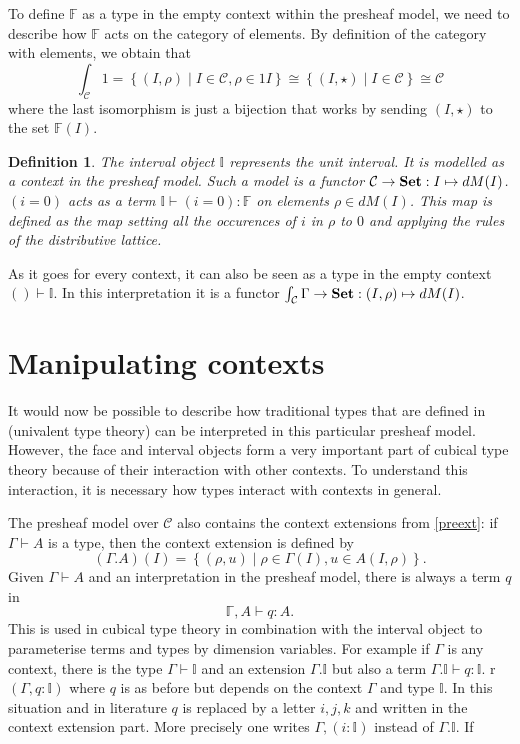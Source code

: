 \documentclass[12pt,a4paper,twoside,xetex]{book}
\newcommand{\keyword}[1]{\emph{#1}\index{#1}}
\newtheorem{definition}[theorem]{Definition}
\begin{document}
To define $\mathbb{F}$ as a type in the empty context within the presheaf model, we need to describe how $\mathbb{F}$ acts on the category of elements. By definition of the category with elements, we obtain that $$\int_{\mathcal{C}} 1 = \left\{ (I, \rho ) \mid I \in \mathcal{C}, \rho \in 1I \right\} \cong \left\{ (I, \star ) \mid I \in \mathcal{C} \right\}  \cong \mathcal{C}$$ where the last isomorphism is just a bijection that works by sending $(I, \star )$ to the set $\mathbb{F}(I)$.


\begin{definition}\label{interval}
The \keyword{interval object} $\mathbb{I}$ represents the unit interval. It is modelled as a context in the presheaf model. Such a model is a functor $\mathcal{C} \rightarrow \text{\textbf{Set}} : I \mapsto dM(I)$.  $(i=0)$ acts as a term $\mathbb{I} \vdash (i = 0) : \mathbb{F}$ on elements $\rho \in dM (I)$. This map is defined as the map setting all the occurences of $i$ in $\rho$ to $0$ and applying the rules of the distributive lattice.
\end{definition}

As it goes for every context, it can also be seen as a type in the empty context $() \vdash \mathbb{I}$. 
In this interpretation it is a functor  $\int_{\mathcal{C}} \Gamma \rightarrow \text{\textbf{Set}} : (I,\rho) \mapsto dM(I)$.



\section{Manipulating contexts}

It would now be possible to describe how traditional types that are defined in (univalent type theory) can be interpreted in this particular presheaf model. However, the face and interval objects form a very important part of cubical type theory because of their interaction with other contexts. To understand this interaction, it is necessary how types interact with contexts in general.  

The presheaf model over $\mathcal{C}$ also contains the context extensions from \cref{preext}: if $\Gamma \vdash A$ is a type, then the context extension is defined by $$(\Gamma . A)(I) = \left\{ (\rho , u ) \mid \rho \in \Gamma (I), u \in A (I,\rho) \right\}.$$
Given $\Gamma \vdash A$ and an interpretation in the presheaf model, there is always a term $q$ in $$\mathbb{\Gamma}, A \vdash q : A.$$ This is used in cubical type theory in combination with the interval object to parameterise terms and types by dimension variables. For example if $\Gamma$ is any context, there is the type $\Gamma \vdash \mathbb{I}$ and an extension $\Gamma. \mathbb{I}$ but also a term $\Gamma. \mathbb{I} \vdash q : \mathbb{I}$.
r $(\Gamma, q : \mathbb{I})$ where $q$ is as before but depends on the context $\Gamma$ and type $\mathbb{I}$. In this situation and in literature $q$ is replaced by a letter $i,j,k$ and written in the context extension part. More precisely one writes $\Gamma, (i: \mathbb{I})$ instead of $\Gamma . \mathbb{I}$. If 
\end{document}
